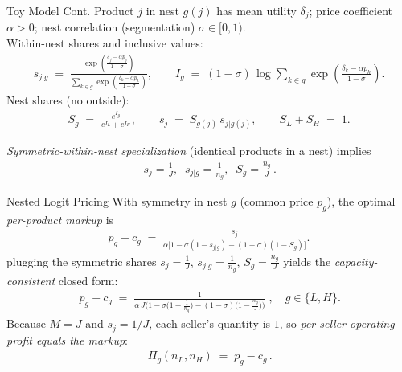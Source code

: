 \documentclass[10pt, xcolor=dvipsnames]{beamer}
\begin{document}
\begin{frame}{Toy Model Cont.}
    Product $j$ in nest $g(j)$ has mean utility $\delta_j$; price coefficient $\alpha>0$; nest correlation (segmentation) $\sigma\in[0,1)$. \\
    
    Within-nest shares and inclusive values:
        \begin{align*}
            s_{j|g} \;=\;
            \frac{\exp\!\left(\frac{\delta_j-\alpha p_j}{1-\sigma}\right)}
            {\sum_{k\in g}\exp\!\left(\frac{\delta_k-\alpha p_k}{1-\sigma}\right)},
            \qquad
            I_g \;=\; (1-\sigma)\,\log\!\sum_{k\in g}\exp\!\left(\frac{\delta_k-\alpha p_k}{1-\sigma}\right).
        \end{align*}
    Nest shares (no outside):
        \begin{align*}
            S_g \;=\;\frac{e^{I_g}}{e^{I_L}+e^{I_H}},
            \qquad
            s_j \;=\; S_{g(j)}\,s_{j|g(j)},
            \qquad
            S_L+S_H \;=\; 1.
        \end{align*}
    
    \emph{Symmetric-within-nest specialization} (identical products in a nest) implies
        \begin{align*}
            \boxed{\,s_j=\tfrac{1}{J},\;\; s_{j|g}=\tfrac{1}{n_g},\;\; S_g=\tfrac{n_g}{J}\,}.
        \end{align*}
    
\end{frame}

\begin{frame}{Nested Logit Pricing}
    With symmetry in nest $g$ (common price $p_g$), the optimal \emph{per-product markup} is
        \begin{align*}
            p_g - c_g \;=\; \frac{s_j}{\alpha\big[1 - \sigma(1-s_{j|g}) - (1-\sigma)(1-S_g)\big]}.
        \end{align*}
plugging the symmetric shares $s_j=\tfrac{1}{J}$, $s_{j|g}=\tfrac{1}{n_g}$, $S_g=\tfrac{n_g}{J}$ yields the \emph{capacity-consistent} closed form:
\begin{align*}
\boxed{
\,p_g - c_g
\;=\;
\frac{1}{\alpha\,J\Big(1 - \sigma\!\big(1-\tfrac{1}{n_g}\big) - (1-\sigma)\!\big(1-\tfrac{n_g}{J}\big)\Big)}\;,\quad g\in\{L,H\}.
}
\end{align*}
Because $M=J$ and $s_j=1/J$, each seller’s quantity is $1$, so \emph{per-seller operating profit equals the markup}:
\begin{align*}
    \boxed{\,\Pi_g(n_L,n_H) \;=\; p_g - c_g\,}.
\end{align*}
    
\end{frame}
\end{document}

